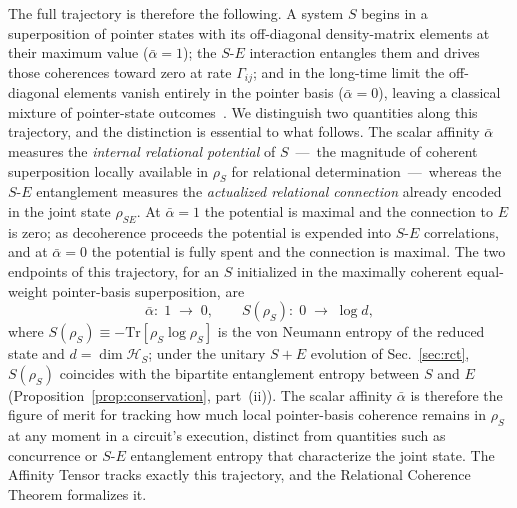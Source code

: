The full trajectory is therefore the following.
A system $S$ begins in a superposition of pointer states with its
off-diagonal density-matrix elements at their maximum value
($\bar{\alpha} = 1$); the $S$-$E$ interaction entangles them and
drives those coherences toward zero at rate $\Gamma_{ij}$; and in
the long-time limit the off-diagonal elements vanish entirely in the
pointer basis ($\bar{\alpha} = 0$), leaving a classical mixture of
pointer-state outcomes~\cite{Zurek2003}.
We distinguish two quantities along this trajectory, and the
distinction is essential to what follows.
The scalar affinity $\bar{\alpha}$ measures the \emph{internal
relational potential} of $S$~---~the magnitude of coherent superposition
locally available in $\rho_S$ for relational determination~---~whereas
the $S$-$E$ entanglement measures the \emph{actualized relational
connection} already encoded in the joint state $\rho_{SE}$.
At $\bar{\alpha} = 1$ the potential is maximal and the connection
to $E$ is zero; as decoherence proceeds the potential is expended into
$S$-$E$ correlations, and at $\bar{\alpha} = 0$ the potential is fully
spent and the connection is maximal.
The two endpoints of this trajectory, for an $S$ initialized in the
maximally coherent equal-weight pointer-basis superposition, are
%
\begin{equation}
\label{eq:complementarity}
  \bar{\alpha}\!:\;1 \;\longrightarrow\; 0,
  \qquad
  S(\rho_S)\!:\;0 \;\longrightarrow\; \log d,
\end{equation}
%
where $S(\rho_S) \equiv -\mathrm{Tr}[\rho_S \log \rho_S]$ is the
von Neumann entropy of the reduced state and $d = \dim \mathcal{H}_S$;
under the unitary $S{+}E$ evolution of Sec.~\ref{sec:rct}, $S(\rho_S)$
coincides with the bipartite entanglement entropy between $S$ and $E$
(Proposition~\ref{prop:conservation}, part~(ii)).
The scalar affinity $\bar{\alpha}$ is therefore the figure of merit
for tracking how much local pointer-basis coherence remains in
$\rho_S$ at any moment in a circuit's execution, distinct from
quantities such as concurrence or $S$-$E$ entanglement entropy that
characterize the joint state.
The Affinity Tensor tracks exactly this trajectory, and the
Relational Coherence Theorem formalizes it.
